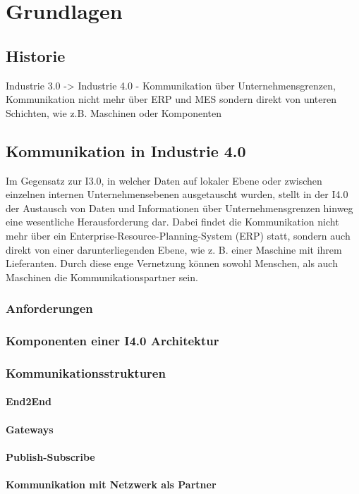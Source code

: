 \chapter{Grundlagen}

\section{Historie}
Industrie 3.0 -> Industrie 4.0 - Kommunikation über Unternehmensgrenzen, Kommunikation nicht mehr über ERP und MES sondern direkt von unteren Schichten, wie z.B. Maschinen oder Komponenten

\section{Kommunikation in Industrie 4.0}
Im Gegensatz zur I3.0, in welcher Daten auf lokaler Ebene oder zwischen einzelnen internen Unternehmensebenen ausgetauscht wurden, stellt in der I4.0 der Austausch von Daten und Informationen über Unternehmensgrenzen hinweg eine wesentliche Herausforderung dar. Dabei findet die Kommunikation nicht mehr über ein Enterprise-Resource-Planning-System (ERP) statt, sondern auch direkt von einer darunterliegenden Ebene, wie z. B. einer Maschine mit ihrem Lieferanten. Durch diese enge Vernetzung können sowohl Menschen, als auch Maschinen die Kommunikationspartner sein.

\subsection{Anforderungen}
\subsection{Komponenten einer I4.0 Architektur}
\subsection{Kommunikationsstrukturen}
\subsubsection{End2End}
\subsubsection{Gateways}
\subsubsection{Publish-Subscribe}
\subsubsection{Kommunikation mit Netzwerk als Partner}

